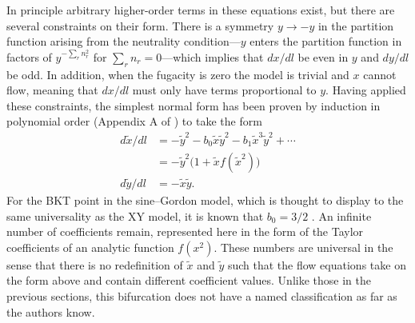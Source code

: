 \documentclass[
 reprint,
 amsmath,amssymb,
 aps, superscriptaddress, pre
]{revtex4-1}
\begin{document}
In principle arbitrary higher-order terms in these equations exist, but there
are several constraints on their form. There is a symmetry $y\to-y$ in the
partition function arising from the neutrality condition---$y$ enters the
partition function in factors of $y^{-\sum_rn_r^2}$ for $\sum_rn_r=0$---which
implies that $dx/dl$ be even in $y$ and $dy/dl$ be odd. In addition, when the
fugacity is zero the model is trivial and $x$ cannot flow, meaning that
$dx/dl$ must only have terms proportional to $y$.  Having applied these
constraints, the simplest normal form has been proven by induction in
polynomial order (Appendix A of \cite{pelissetto2013renormalization}) to take
the form
\begin{align}
  \label{eq:kt-normalform:1}
  d\tilde x/dl&=-\tilde y^2-b_0\tilde x\tilde y^2-b_1\tilde x^3\tilde y^2+\cdots\\
  \label{eq:kt-normalform:2}
       &=-\tilde y^2\big(1+\tilde xf(\tilde x^2)\big)\\
  \label{eq:kt-normalform:3}
  d\tilde y/dl&=-\tilde x\tilde y.
\end{align}
For the BKT point in the sine--Gordon model, which is thought to display to
the same universality as the XY model, it is known that $b_0=3/2$
\cite{balog2000intrinsic, pelissetto2013renormalization}. An infinite number
of coefficients remain, represented here in the form of the Taylor
coefficients of an analytic function $f(x^2)$. These numbers are universal in the
sense that there is no redefinition of $\tilde x$ and $\tilde y$ such that the
flow equations take on the form above and contain different coefficient
values.  Unlike those in the previous sections, this bifurcation does not have
a named classification as far as the authors know. 
\end{document}
